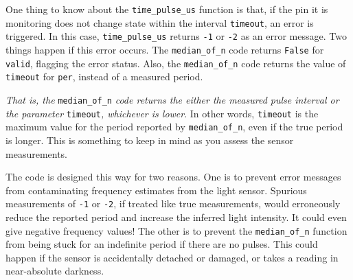 One thing to know about the \lstinline{time_pulse_us} function is that, if the pin it is monitoring does not change state within the interval \texttt{timeout}, an error is triggered.
In this case, \lstinline{time_pulse_us} returns \texttt{-1} or \texttt{-2} as an error message.
Two things happen if this error occurs.
The \lstinline{median_of_n} code returns \texttt{False} for \lstinline{valid}, flagging the error status.
Also, the  \lstinline{median_of_n} code returns the value of \texttt{timeout} for \lstinline{per}, instead of a measured period.

\emph{That is, the} \lstinline{median_of_n} \emph{code returns the either the measured pulse interval or the parameter} \lstinline{timeout}\emph{, whichever is lower}.
In other words, \texttt{timeout} is the maximum value for the period reported by \lstinline{median_of_n}, even if the true period is longer.
This is something to keep in mind as you assess the sensor measurements.

The code is designed this way for two reasons.
One is to prevent error messages from contaminating frequency estimates from the light sensor.
Spurious measurements of \texttt{-1} or \texttt{-2}, if treated like true measurements, would erroneously reduce the reported period and increase the inferred light intensity.
It could even give negative frequency values!
The other is to prevent the \lstinline{median_of_n} function from being stuck for an indefinite period if there are no pulses.
This could happen if the sensor is accidentally detached or damaged, or takes a reading in near-absolute darkness.


